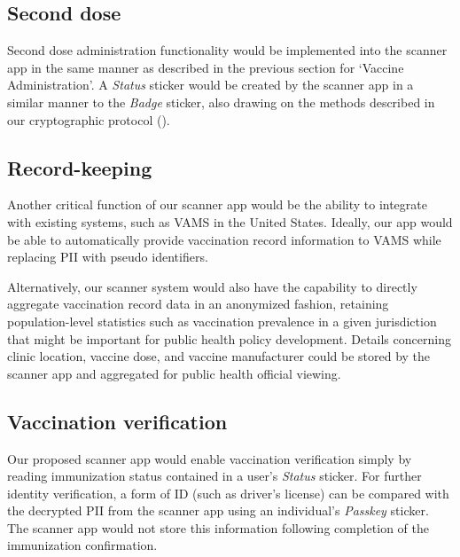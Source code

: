 \subsection{Second dose}

Second dose administration functionality would be implemented into the scanner app in the same manner as described in the previous section for ‘Vaccine Administration’. A \textit{Status} sticker would be created by the scanner app in a similar manner to the \textit{Badge} sticker, also drawing on the methods described in our cryptographic protocol (\cite{crypt}). 

\subsection{Record-keeping}
Another critical function of our scanner app would be the ability to integrate with existing systems, such as VAMS in the United States. Ideally, our app would be able to automatically provide vaccination record information to VAMS while replacing PII with pseudo identifiers. 

Alternatively, our scanner system would also have the capability to directly aggregate vaccination record data in an anonymized fashion, retaining population-level statistics such as vaccination prevalence in a given jurisdiction that might be important for public health policy development. Details concerning clinic location, vaccine dose, and vaccine manufacturer could be stored by the scanner app and aggregated for public health official viewing.  


\subsection{Vaccination verification}
Our proposed scanner app would enable vaccination verification simply by reading immunization status contained in a user’s \textit{Status} sticker. For further identity verification, a form of ID (such as driver’s license) can be compared with the decrypted PII from the scanner app using an individual’s \textit{Passkey} sticker.  The scanner app would not store this information following completion of the immunization confirmation.

